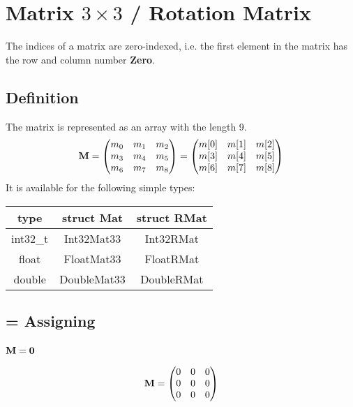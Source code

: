 \section{Matrix $3\times3$ / Rotation Matrix}
The indices of a matrix are zero-indexed, i.e. the first element in the matrix has the row and column number \textbf{Zero}.
\subsection{Definition}
The matrix is represented as an array with the length 9.
\begin{equation}
\mat M = \begin{pmatrix}
m_0 & m_1 & m_2 \\
m_3 & m_4 & m_5 \\
m_6 & m_7 & m_8
\end{pmatrix} = \begin{pmatrix}
m[0] & m[1] & m[2] \\
m[3] & m[4] & m[5] \\
m[6] & m[7] & m[8]
\end{pmatrix}
\end{equation}
It is available for the following simple types:\\
\begin{tabular}{c|c|c}
type		& struct Mat	& struct RMat	\\ \hline
int32\_t	& Int32Mat33	& Int32RMat		\\
float		& FloatMat33	& FloatRMat		\\
double		& DoubleMat33	& DoubleRMat
\end{tabular}



\subsection{= Assigning}
\subsubsection*{$\mat M = \mat 0$}
\begin{equation}
\mat M = \begin{pmatrix}
0 & 0 & 0 \\
0 & 0 & 0 \\
0 & 0 & 0
\end{pmatrix}
\end{equation}

